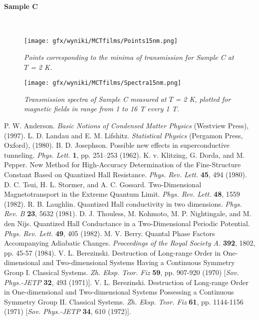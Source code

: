 \documentclass[titlepage,a4paper]{book}
\newcommand{\myparagraph}[1]{\paragraph{#1}\mbox{}\\}
\begin{document}
\clearpage
\myparagraph{Sample C}
\begin{figure}[H]
	\centering
	\texttt{[image: gfx/wyniki/MCTfilms/Points15nm.png]}
	\vspace{-10pt}
	\caption{\textit{Points corresponding to the minima of transmission for Sample C at $T$ = 2 K.}}
	\label{fig:Points15nm}
\end{figure}
\begin{figure}[H]
	\centering
	\texttt{[image: gfx/wyniki/MCTfilms/Spectra15nm.png]}
	\vspace{-10pt}
	\caption{\textit{Transmission spectra of Sample C measured at $T$ = 2 K, plotted for magnetic fields in range from 1 to 16 T every 1 T.}}
	\label{fig:Spectra15nm}
\end{figure}


\begin{thebibliography}{199}
P. W. Anderson. \textit{Basic Notions of Condensed Matter Physics} (Westview Press), (1997).
L. D. Landau and E. M. Lifshitz. \textit{Statistical Physics} (Pergamon Press, Oxford), (1980).
B. D. Josephson. Possible new effects in superconductive tunneling. \textit{Phys. Lett.} \textbf{1}, pp. 251–253 (1962).
K. v. Klitzing, G. Dorda, and M. Pepper. New Method for High-Accuracy Determination of the Fine-Structure Constant Based on Quantized Hall Resistance. \textit{Phys. Rev. Lett.} \textbf{45}, 494 (1980).
D. C. Tsui, H. L. Stormer, and A. C. Gossard. Two-Dimensional Magnetotransport in the Extreme Quantum Limit. \textit{Phys. Rev. Lett.} \textbf{48}, 1559 (1982).
R. B. Laughlin. Quantized Hall conductivity in two dimensions. \textit{Phys. Rev. B} \textbf{23}, 5632 (1981).
D. J. Thouless, M. Kohmoto, M. P. Nightingale, and M. den Nijs. Quantized Hall Conductance in a Two-Dimensional Periodic Potential. \textit{Phys. Rev. Lett.} \textbf{49}, 405 (1982).
M. V. Berry. Quantal Phase Factors Accompanying Adiabatic Changes. \textit{Proceedings of the Royal Society A.} \textbf{392}, 1802, pp. 45-57 (1984).
V. L. Berezinski. Destruction of Long-range Order in One-dimensional and Two-dimensional Systems Having a Continuous Symmetry Group I. Classical Systems. \textit{Zh. Eksp. Teor. Fiz} \textbf{59}, pp. 907-920 (1970) [\textit{Sov. Phys.-JETP} \textbf{32}, 493 (1971)].
V. L. Berezinski. Destruction of Long-range Order in One-dimensional and Two-dimensional Systems Possessing a Continuous Symmetry Group II. Classical Systems. \textit{Zh. Eksp. Teor. Fiz} \textbf{61}, pp. 1144-1156 (1971) [\textit{Sov. Phys.-JETP} \textbf{34}, 610 (1972)].

\end{thebibliography}
\end{document}
